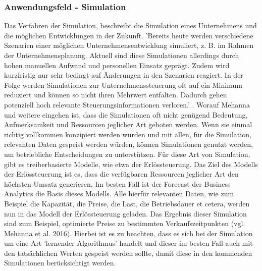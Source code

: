 \documentclass[12pt,twocolumn,twoside]{conference}   %
\begin{document}
\subsubsection{Anwendungsfeld - Simulation}
Das Verfahren der Simulation, beschreibt die Simulation eines Unternehmens und die möglichen Entwicklungen in der Zukunft. 'Bereits heute werden verschiedene Szenarien einer möglichen Unternehmensentwicklung simuliert,
z. B. im Rahmen der Unternehmensplanung. Aktuell sind diese Simulationen allerdings durch hohen manuellen Aufwand und personellen Einsatz geprägt. Zudem wird kurzfristig nur sehr bedingt auf Änderungen in den Szenarien reagiert. In der Folge werden Simulationen zur Unternehmenssteuerung oft auf ein Minimum reduziert und können so nicht ihren Mehrwert entfalten. Dadurch gehen potenziell hoch relevante Steuerungsinformationen verloren.' \cite{Mehanna et al. 2016}. Worauf Mehanna und weitere eingehen ist, dass die Simulationen oft nicht genügend Bedeutung, Aufmerksamkeit und Ressourcen jeglicher Art geboten werden. Wenn sie einmal richtig vollkommen konzipiert werden würden und mit allen, für die Simulation, relevanten Daten gespeist werden würden, können Simulationen genutzt werden, um betriebliche Entscheidungen zu unterstützen. Für diese Art von Simulation, gibt es treiberbasierte Modelle, wie etwa der Erlössteuerung. Das Ziel des Modells der Erlössteuerung ist es, dass die verfügbaren Ressourcen jeglicher Art den höchsten Umsatz generieren. Im besten Fall ist der Forecast der Business Analytics die Basis dieses Modells. Alle hierfür relevanten Daten, wie zum Beispiel die Kapazität, die Preise, die Last, die Betriebsdauer et cetera, werden nun in das Modell der Erlössteuerung geladen. Das Ergebnis dieser Simulation sind zum Beispiel, optimierte Preise zu bestimmten Verkaufszeitpunkten (vgl. Mehanna et al. 2016). Hierbei ist es zu beachten, dass es sich bei der Simulation um eine Art 'lernender Algorithmus' handelt und dieser im besten Fall auch mit den tatsächlichen Werten gespeist werden sollte, damit diese in den kommenden Simulationen berücksichtigt werden. 
\end{document}
